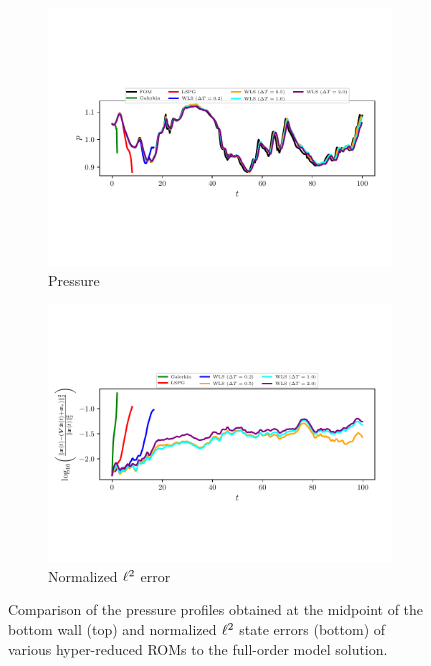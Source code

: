 \begin{figure}
\begin{center}

\begin{subfigure}[t]{0.95\textwidth}
\includegraphics[trim={0cm 2.5cm 0cm 2.5cm},clip,width=1.\linewidth]{figs/cavity/pressure.pdf}
\caption{Pressure} 
\label{fig:cav_results1a_basis1}
\end{subfigure}

\begin{subfigure}[t]{1.0\textwidth}
\includegraphics[trim={0cm 2.5cm 0cm 3cm},clip,width=1.\linewidth]{figs/cavity/error.pdf}
\caption{Normalized $\ell^2$ error}
\label{fig:cav_results1b_basis1}
\end{subfigure}
\end{center}
\caption{Comparison of the pressure profiles obtained at the midpoint of the bottom wall (top) and normalized $\ell^2$ state errors (bottom) of various hyper-reduced ROMs to the full-order model solution.}
\label{fig:cav_results1_basis1}
\end{figure}


